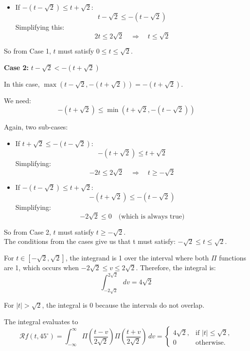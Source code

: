 \documentclass[12pt,twoside]{article}
\begin{document}
\begin{enumerate}
\begin{itemize}
    \item If \( -(t - \sqrt{2}) \leq t + \sqrt{2} \):
    \[
    t - \sqrt{2} \leq -(t - \sqrt{2})
    \]
    Simplifying this:
    \[
    2t \leq 2\sqrt{2} \quad \Rightarrow \quad t \leq \sqrt{2}
    \]
\end{itemize}

So from Case 1, \( t \) must satisfy \( 0 \leq t \leq \sqrt{2} \).

\textbf{Case 2: } \( t - \sqrt{2} < -(t + \sqrt{2}) \)

In this case, \( \max(t - \sqrt{2}, -(t + \sqrt{2})) = -(t + \sqrt{2}) \).

We need:
\[
-(t + \sqrt{2}) \leq \min(t + \sqrt{2}, -(t - \sqrt{2}))
\]

Again, two sub-cases:

\begin{itemize}
    \item If \( t + \sqrt{2} \leq -(t - \sqrt{2}) \):
    \[
    -(t + \sqrt{2}) \leq t + \sqrt{2}
    \]
    Simplifying:
    \[
    -2t \leq 2\sqrt{2} \quad \Rightarrow \quad t \geq -\sqrt{2}
    \]

    \item If \( -(t - \sqrt{2}) \leq t + \sqrt{2} \):
    \[
    -(t + \sqrt{2}) \leq -(t - \sqrt{2})
    \]
    Simplifying:
    \[
    -2\sqrt{2} \leq 0 \quad \text{(which is always true)}
    \]
\end{itemize}

So from Case 2, \( t \) must satisfy \( t \geq -\sqrt{2} \).
\[\]
The conditions from the cases give us that t must satisfy: $- \sqrt{2}  \leq  t  \leq  \sqrt{2} $.

For $t \in \left[ - \sqrt{2},  \sqrt{2} \right]$, the integrand is 1 over the interval where both $\Pi$ functions are 1, which occurs when 
$ -2 \sqrt{2}  \leq  v  \leq  2 \sqrt{2}$. Therefore, the integral is:
\[
	 \int_{-2 \sqrt{2}}^{2 \sqrt{2}} dv  = 4 \sqrt{2}
\]

For $|t| > \sqrt{2}$, the integral is 0  because the intervals do not overlap.

The integral evaluates to
\[
\mathcal{R}f(t, 45^{\circ})  =
 \int_{-\infty}^{\infty} \Pi\left(\frac{t-v}{2\sqrt{2}}\right) \Pi\left(\frac{t+v}{2\sqrt{2}}\right) \, dv  =
\begin{cases}
     4 \sqrt{2}, & \text{if } |t| \leq \sqrt{2}, \\
    0 & \text{otherwise}.
\end{cases}
\]

  \end{enumerate}
\end{document}
